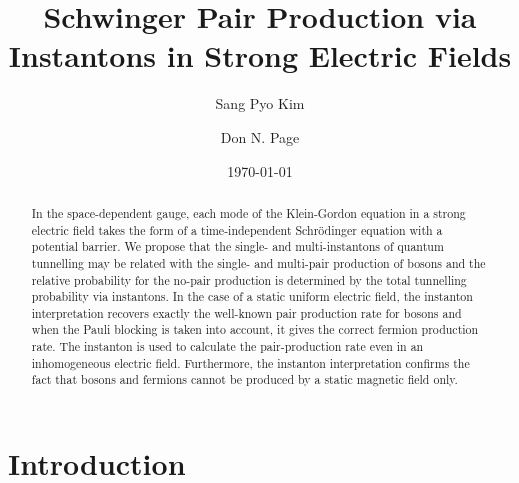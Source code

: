 \documentclass[a4paper,prd,showpacs,preprintnumbers,amsmath,amssymb]{revtex4}
\begin{document}


\title{Schwinger Pair Production via Instantons in Strong Electric Fields}

\author{Sang Pyo Kim}


\author{Don N. Page}



\date{\today}
\begin{abstract}
In the space-dependent gauge, each mode of the Klein-Gordon
equation in a strong electric field takes the form of a
time-independent Schr\"{o}dinger equation with a potential
barrier. We propose that the single- and multi-instantons of
quantum tunnelling may be related with the single- and multi-pair
production of bosons and the relative probability for the no-pair
production is determined by the total tunnelling probability via
instantons. In the case of a static uniform electric field, the
instanton interpretation recovers exactly the well-known pair
production rate for bosons and when the Pauli blocking is taken
into account, it gives the correct fermion production rate. The
instanton is used to calculate the pair-production rate even in an
inhomogeneous electric field.  Furthermore, the instanton
interpretation confirms the fact that bosons and fermions cannot
be produced by a static magnetic field only.
\end{abstract}


\maketitle











\section{Introduction}
\end{document}
